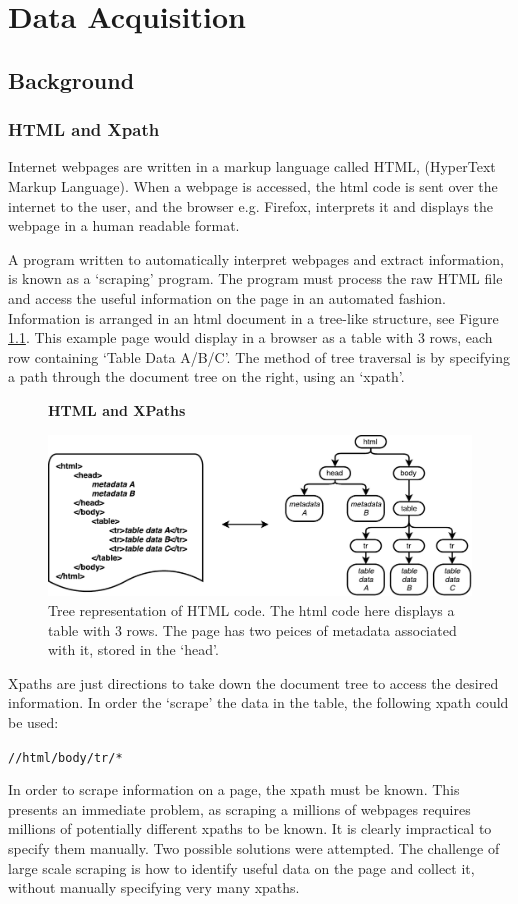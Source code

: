 \chapter{Data Acquisition}
\label{chapt:DATA_ACQUISITION}
\section{Background}
\subsection{HTML and Xpath}

Internet webpages are written in a markup language called HTML, (HyperText Markup Language). When a webpage is accessed, the html code is sent over the internet to the user, and the browser e.g. Firefox, interprets it and displays the webpage in a human readable format. 

A program written to automatically interpret webpages and extract information, is known as a `scraping' program. The program must process the raw HTML file and access the useful information on the page in an automated fashion. Information is arranged in an html document in a tree-like structure, see Figure \ref{fig:HTMLTREE}. This example page would display in a browser as a table with 3 rows, each row containing `Table Data A/B/C'. The method of tree traversal is by specifying a path through the document tree on the right, using an `xpath'. 
\begin{figure}[H]
    \centering
    \textbf{HTML and XPaths}\par\medskip
    \includegraphics[scale=0.7]{Data_Acquisition/html_tree.pdf}
    \caption{Tree representation of HTML code. The html code here displays a table with 3 rows. The page has two peices of metadata associated with it, stored in the `head'.\label{fig:HTMLTREE}}
\end{figure}
Xpaths are just directions to take down the document tree to access the desired information. In order the `scrape' the data in the table, the following xpath could be used:
\begin{center}
\texttt{//html/body/tr/*}
\end{center}
In order to scrape information on a page, the xpath must be known. 
This presents an immediate problem, as scraping a millions of webpages requires millions of potentially different xpaths to be known. It is clearly impractical to specify them manually. Two possible solutions were attempted.
The challenge of large scale scraping is how to identify useful data on the page and collect it, without manually specifying very many xpaths.
